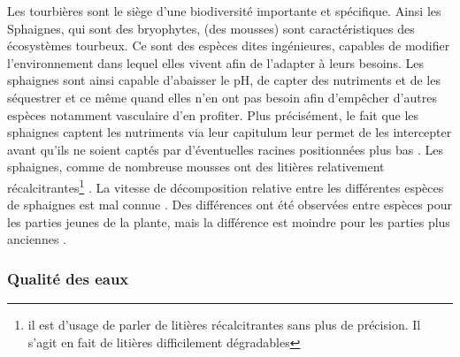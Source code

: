 

Les tourbières sont le siège d'une biodiversité importante et spécifique.
Ainsi les Sphaignes, qui sont des bryophytes, (des mousses) sont caractéristiques des écosystèmes tourbeux.
Ce sont des espèces dites ingénieures, capables de modifier l'environnement dans lequel elles vivent afin de l'adapter à leurs besoins.
Les sphaignes sont ainsi capable d'abaisser le pH, de capter des nutriments et de les séquestrer et ce même quand elles n'en ont pas besoin afin d'empêcher d'autres espèces notamment vasculaire d'en profiter.
Plus précisément, le fait que les sphaignes captent les nutriments via leur capitulum leur permet de les intercepter avant qu'ils ne soient captés par d'éventuelles racines positionnées plus bas \citep{malmer1994,svensson1995}.
Les sphaignes, comme de nombreuse mousses ont des litières relativement récalcitrantes\footnote{il est d'usage de parler de litières récalcitrantes sans plus de précision. Il s'agit en fait de litières difficilement dégradables} \citep{hobbie1996,liu2000}.
La vitesse de décomposition relative entre les différentes espèces de sphaignes est mal connue \citep{cornelissen2007}.
Des différences ont été observées entre espèces pour les parties jeunes de la plante, mais la différence est moindre pour les parties plus anciennes \citep{limpens2003}.

\subsubsection{Qualité des eaux}


